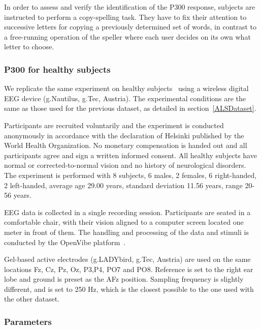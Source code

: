\documentclass[utf8]{frontiersSCNS} %
\begin{document}
In order to assess and verify the identification of the P300 response, subjects are instructed to perform a copy-spelling task. They have to fix their attention to successive letters for copying a previously determined set of words, in contrast to a free-running operation of the speller where each user decides on its own what letter to choose.

\subsubsection{P300 for healthy subjects}

We replicate the same experiment on healthy subjects~\citep{owndataset} using a wireless digital EEG device (g.Nautilus, g.Tec, Austria).  The experimental conditions are the same as those used for the previous dataset, as detailed in section~\ref{ALSDataset}.

Participants are recruited voluntarily and the experiment is conducted anonymously in accordance with the declaration of Helsinki published by the World Health Organization.  No monetary compensation is handed out and all participants agree and sign a written informed consent.  All healthy subjects have normal or corrected-to-normal vision and no history of neurological disorders. The experiment is performed with 8 subjects, 6 males, 2 females, 6 right-handed, 2 left-handed, average age 29.00 years, standard deviation  11.56 years, range 20-56 years.

EEG data is collected in a single recording session. Participants are seated in a comfortable chair, with their vision aligned to a computer screen located one meter in front of them.  The handling and processing of the data and stimuli is conducted by the OpenVibe platform~\citep{Renard2010}. 

Gel-based active electrodes (g.LADYbird, g.Tec, Austria) are used on the same locations Fz, Cz, Pz, Oz, P3,P4, PO7 and PO8.  Reference is set to the right ear lobe and ground is preset as the AFz position.   Sampling frequency is slightly different, and is set to 250 Hz, which is the closest possible to the one used with the other dataset.



\subsubsection{Parameters}
\end{document}
